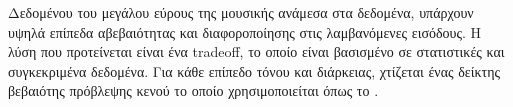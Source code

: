 Δεδομένου του μεγάλου εύρους της μουσικής ανάμεσα στα δεδομένα, υπάρχουν υψηλά επίπεδα αβεβαιότητας και διαφοροποίησης στις λαμβανόμενες εισόδους. Η λύση που προτείνεται είναι ένα tradeoff, το οποίο είναι βασισμένο σε στατιστικές και συγκεκριμένα δεδομένα. Για κάθε επίπεδο τόνου και διάρκειας, χτίζεται ένας δείκτης βεβαιότης πρόβλεψης κενού το οποίο χρησιμοποιείται όπως το .
\undef{\fp}
\undef{\fps}
